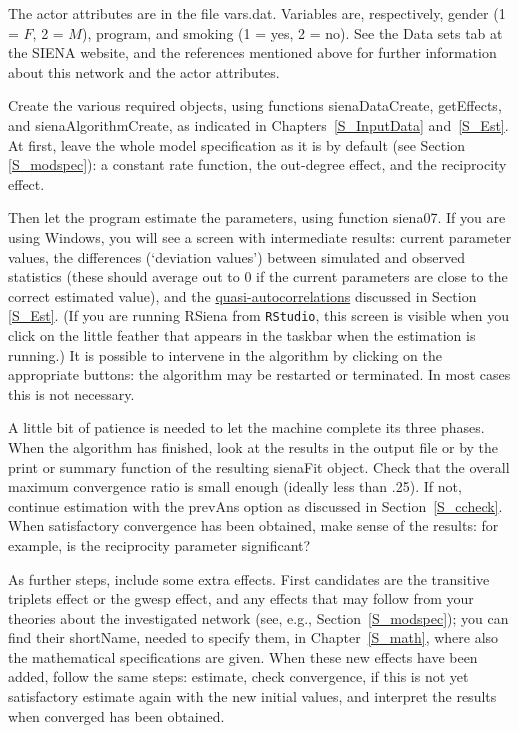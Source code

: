 \documentclass[a4paper,fleqn,11pt]{article}
\newcommand{\+}{\, + \,}
\newcommand{\sfn}[1]{\textsf{#1}}
\newcommand{\RS}{{\sf \textsf{RSiena} }}
\newcommand{\SI}{{\sf SIENA }}
\begin{document}
The actor attributes are in the file {\sf vars.dat}. Variables
are, respectively, gender (1 = $F$, 2 = $M$), program, and smoking
(1 = yes, 2 = no). See the \sfn{Data sets} tab at the
\SI website, and the references mentioned above for further
information about this network and the actor attributes.

Create the various required objects, using functions
\textsf{sienaDataCreate}, \textsf{getEffects}, and \textsf{sienaAlgorithmCreate},
as indicated in Chapters~\ref{S_InputData} and~\ref{S_Est}.
At first, leave the whole model specification as
it is by default (see Section \ref{S_modspec}):
a constant rate function, the out-degree effect, and
the reciprocity effect.

Then let the program estimate the parameters, using function \textsf{siena07}.
If you are using Windows, you will see a
screen with intermediate results: current parameter values, the
differences (`deviation values') between simulated and observed
statistics (these should average out to 0 if the current
parameters are close to the correct estimated value), and the
\hyperlink{T_quasiac}{quasi-autocorrelations} discussed in Section
\ref{S_Est}.
(If you are running \RS from \texttt{RStudio}, this screen is visible
when you click on the little feather that appears in the taskbar
when the estimation is running.)
It is possible to intervene in the algorithm by clicking on the
appropriate buttons:
the algorithm may be restarted or terminated. In most cases
this is not necessary.

A little bit of patience is needed to let the machine complete its three
phases.
When the algorithm has finished, look at the results in the output file
or by the \sfn{print} or \sfn{summary} function of the
resulting \sfn{sienaFit} object. Check
that the overall maximum convergence ratio is small enough
(ideally less than .25).
If not, continue estimation with the \sfn{prevAns} option
as discussed in Section~\ref{S_ccheck}.
When satisfactory convergence has been obtained, make sense
of the results: for example, is the reciprocity parameter significant?

As further steps, include some extra effects. First candidates
are the transitive triplets effect or the gwesp effect, and any
effects that may follow from your theories about the investigated network
(see, e.g., Section~\ref{S_modspec});
you can find their \sfn{shortName},
needed to specify them, in Chapter~\ref{S_math},
where also the mathematical specifications are given.
When these new effects have been added, follow the same steps:
estimate, check convergence, if this is not yet satisfactory
estimate again with the new initial values, and interpret the
results when converged has been obtained.
\end{document}
